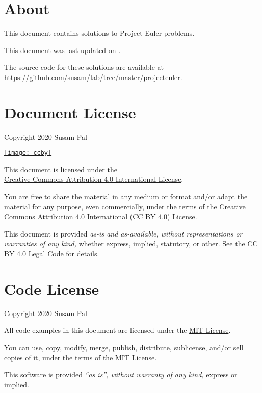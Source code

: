 \appendix
\newcommand{\srcurl}{https://github.com/susam/lab/tree/master/projecteuler}
\newcommand{\ccbyurl}{http://creativecommons.org/licenses/by/4.0/}
\newcommand{\ccbylcurl}{https://creativecommons.org/licenses/by/4.0/legalcode}
\newcommand{\mitlurl}{https://opensource.org/licenses/MIT}

\section{About}

\ifdefined\pn
    \def\this{this}
    \def\is{is}
    \def\problem{problem \number\pn}
    \def\solution{solution}
\else
    \def\this{these}
    \def\is{are}
    \def\problem{problems}
    \def\solution{solutions}
\fi
This document contains \solution{} to Project Euler \problem{}.

This document was last updated on \updatedate{}.

The source code for \this{} \solution{} \is{} available at\\
\url{\srcurl}.


\section{Document License}

Copyright \textcopyright{} 2020 Susam Pal

\href{\ccbyurl}{\texttt{[image: ccby]}}

This document is licensed under the\\
\href{\ccbyurl}{Creative Commons Attribution 4.0 International License}.

You are free to share the material in any medium or format and/or adapt
the material for any purpose, even commercially, under the terms of the
Creative Commons Attribution 4.0 International (CC BY 4.0) License.

This document is provided \emph{as-is and as-available, without
representations or warranties of any kind,} whether express, implied,
statutory, or other. See the
\href{\ccbylcurl}{CC BY 4.0 Legal Code} for details.


\pagebreak
\section{Code License}

Copyright \textcopyright{} 2020 Susam Pal

All code examples in this document are licensed under the
\href{\mitlurl}{MIT License}.

You can use, copy, modify, merge, publish, distribute, sublicense,
and/or sell copies of it, under the terms of the MIT License.

This software is provided \emph{``as is'', without warranty of any
kind,} express or implied.


